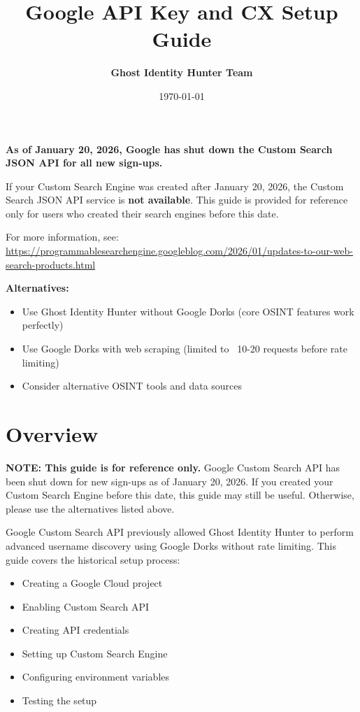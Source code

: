 \documentclass[11pt,a4paper]{article}
\title{\textbf{\color{googleblue}Google API Key and CX Setup Guide}}
\author{\textbf{Ghost Identity Hunter Team}}
\date{\today}
\begin{document}
\maketitle

\begin{tcolorbox}[colback=googlered!10,colframe=googlered,title=CRITICAL NOTICE - Google Custom Search JSON API Shutdown]
\textbf{As of January 20, 2026, Google has shut down the Custom Search JSON API for all new sign-ups.}

If your Custom Search Engine was created after January 20, 2026, the Custom Search JSON API service is \textbf{not available}. This guide is provided for reference only for users who created their search engines before this date.

For more information, see: \url{https://programmablesearchengine.googleblog.com/2026/01/updates-to-our-web-search-products.html}

\textbf{Alternatives:}
\begin{itemize}
    \item Use Ghost Identity Hunter without Google Dorks (core OSINT features work perfectly)
    \item Use Google Dorks with web scraping (limited to ~10-20 requests before rate limiting)
    \item Consider alternative OSINT tools and data sources
\end{itemize}
\end{tcolorbox}

\tableofcontents
\newpage

\section{Overview}

\textbf{NOTE: This guide is for reference only.} Google Custom Search API has been shut down for new sign-ups as of January 20, 2026. If you created your Custom Search Engine before this date, this guide may still be useful. Otherwise, please use the alternatives listed above.

Google Custom Search API previously allowed Ghost Identity Hunter to perform advanced username discovery using Google Dorks without rate limiting. This guide covers the historical setup process:

\begin{itemize}
    \item Creating a Google Cloud project
    \item Enabling Custom Search API
    \item Creating API credentials
    \item Setting up Custom Search Engine
    \item Configuring environment variables
    \item Testing the setup
\end{itemize}
\end{document}
